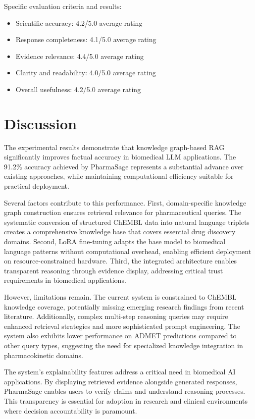 \documentclass[conference]{IEEEtran}
\begin{document}
Specific evaluation criteria and results:
\begin{itemize}
\item Scientific accuracy: 4.2/5.0 average rating
\item Response completeness: 4.1/5.0 average rating
\item Evidence relevance: 4.4/5.0 average rating
\item Clarity and readability: 4.0/5.0 average rating
\item Overall usefulness: 4.2/5.0 average rating
\end{itemize}

\section{Discussion}

The experimental results demonstrate that knowledge graph-based RAG significantly improves factual accuracy in biomedical LLM applications. The 91.2\% accuracy achieved by PharmaSage represents a substantial advance over existing approaches, while maintaining computational efficiency suitable for practical deployment.

Several factors contribute to this performance. First, domain-specific knowledge graph construction ensures retrieval relevance for pharmaceutical queries. The systematic conversion of structured ChEMBL data into natural language triplets creates a comprehensive knowledge base that covers essential drug discovery domains. Second, LoRA fine-tuning adapts the base model to biomedical language patterns without computational overhead, enabling efficient deployment on resource-constrained hardware. Third, the integrated architecture enables transparent reasoning through evidence display, addressing critical trust requirements in biomedical applications.

However, limitations remain. The current system is constrained to ChEMBL knowledge coverage, potentially missing emerging research findings from recent literature. Additionally, complex multi-step reasoning queries may require enhanced retrieval strategies and more sophisticated prompt engineering. The system also exhibits lower performance on ADMET predictions compared to other query types, suggesting the need for specialized knowledge integration in pharmacokinetic domains.

The system's explainability features address a critical need in biomedical AI applications. By displaying retrieved evidence alongside generated responses, PharmaSage enables users to verify claims and understand reasoning processes. This transparency is essential for adoption in research and clinical environments where decision accountability is paramount.
\end{document}
